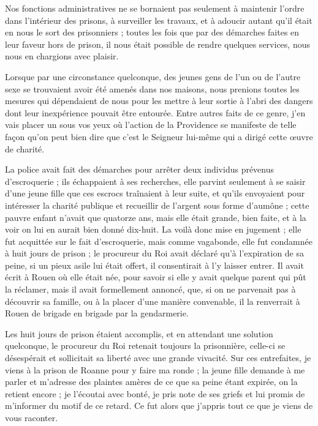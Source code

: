 \documentclass[11pt,a4paper]{report}
\begin{document}
Nos fonctions administratives ne se bornaient pas seulement à maintenir l'ordre dans l'intérieur des prisons, à surveiller les travaux, et à adoucir autant qu'il était en nous le sort des prisonniers ; toutes les fois que par des démarches faites en leur faveur hors de prison, il nous était possible de rendre quelques services, nous nous en chargions avec plaisir.

Lorsque par une circonstance quelconque, des jeunes gens de l'un ou de l'autre sexe se trouvaient avoir été amenés dans nos maisons, nous prenions toutes les mesures qui dépendaient de nous pour les mettre à leur sortie à l'abri des dangers dont leur inexpérience pouvait être entourée. Entre autres faits de ce genre, j'en vais placer un sous vos yeux où l'action de la Providence se manifeste de telle façon qu'on peut bien dire que c'est le Seigneur lui-même qui a dirigé cette œuvre de charité.

La police avait fait des démarches pour arrêter deux individus prévenus d'escroquerie ; ils échappaient à ses recherches, elle parvint seulement à se saisir d'une jeune fille que ces escrocs traînaient à leur suite, et qu'ils envoyaient pour intéresser la charité publique et recueillir de l'argent sous forme d'aumône ; cette pauvre enfant n'avait que quatorze ans, mais elle était grande, bien faite, et à la voir on lui en aurait bien donné dix-huit. La voilà donc mise en jugement ; elle fut acquittée sur le fait d'escroquerie, mais comme vagabonde, elle fut condamnée à huit jours de prison ; le procureur du Roi avait déclaré qu'à l'expiration de sa peine, si un pieux asile lui était offert, il consentirait à l'y laisser entrer. Il avait écrit à Rouen où elle était née, pour savoir si elle y avait quelque parent qui pût la réclamer, mais il avait formellement annoncé, que, si on ne parvenait pas à découvrir sa famille, ou à la placer d'une manière convenable, il la renverrait à Rouen de brigade en brigade par la gendarmerie.

Les huit jours de prison étaient accomplis, et en attendant une solution quelconque, le procureur du Roi retenait toujours la prisonnière, celle-ci se désespérait et sollicitait sa liberté avec une grande vivacité. Sur ces entrefaites, je viens à la prison de Roanne pour y faire ma ronde ; la jeune fille demande à me parler et m'adresse des plaintes amères de ce que sa peine étant expirée, on la retient encore ; je l'écoutai avec bonté, je pris note de ses griefs et lui promis de m'informer du motif de ce retard. Ce fut alors que j'appris tout ce que je viens de vous raconter.
\end{document}

